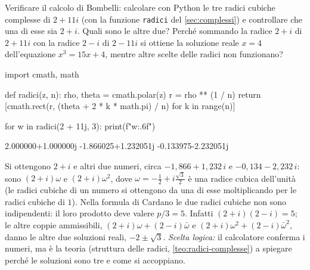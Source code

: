 \begin{esercizio}
Verificare il calcolo di Bombelli: calcolare con Python le tre radici cubiche
complesse di $2+11i$ (con la funzione \texttt{radici} del \cref{sec:complessi}) e
controllare che una di esse sia $2+i$. Quali sono le altre due? Perché sommando la
radice $2+i$ di $2+11i$ con la radice $2-i$ di $2-11i$ si ottiene la soluzione reale $x=4$
dell'equazione $x^{3}=15x+4$, mentre altre scelte delle radici non funzionano?
\begin{soluzione}
\begin{python}
import cmath, math

def radici(z, n):
    rho, theta = cmath.polar(z)
    r = rho ** (1 / n)
    return [cmath.rect(r, (theta + 2 * k * math.pi) / n)
            for k in range(n)]

for w in radici(2 + 11j, 3):
    print(f"{w:.6f}")
\end{python}
\begin{risultato}
2.000000+1.000000j
-1.866025+1.232051j
-0.133975-2.232051j
\end{risultato}
Si ottengono $2+i$ e altri due numeri, circa $-1{,}866+1{,}232\,i$ e
$-0{,}134-2{,}232\,i$: sono $(2+i)\omega$ e $(2+i)\omega^{2}$, dove
$\omega=-\frac12+i\frac{\sqrt3}{2}$ è una radice cubica dell'unità (le radici cubiche di
un numero si ottengono da una di esse moltiplicando per le radici cubiche di $1$). Nella
formula di Cardano le due radici cubiche non sono indipendenti: il loro prodotto deve
valere $p/3=5$. Infatti $(2+i)(2-i)=5$; le altre coppie ammissibili,
$(2+i)\omega+(2-i)\bar\omega$ e $(2+i)\omega^{2}+(2-i)\bar\omega^{2}$, danno le altre due
soluzioni reali, $-2\pm\sqrt3$. \emph{Scelta logica:} il calcolatore conferma i numeri,
ma è la teoria (struttura delle radici, \cref{teo:radici-complesse}) a spiegare
perché le soluzioni sono tre e come si accoppiano.
\end{soluzione}
\end{esercizio}
